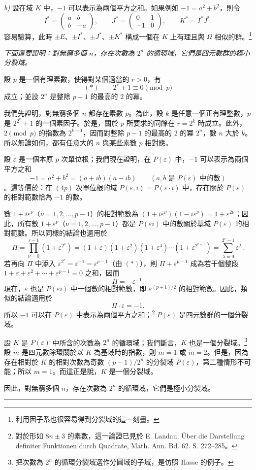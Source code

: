 \documentclass[11pt]{article}
\providecommand{\srcspaced}[1]{\emph{#1}}
\providecommand{\mat}[1]{\begin{pmatrix}#1\end{pmatrix}}
\begin{document}
\emph{b)} 設在域 $K$ 中，$-1$ 可以表示為兩個平方之和。如果例如 $-1=a^2+b^2$，則令
\[
        I^*=\mat{a&b\\ b&-a},\qquad
        J^*=\mat{0&1\\-1&0},\qquad
        K^*=I^*J^*.
\]
容易驗算，此時 $\pm E$、$\pm I^*$、$\pm J^*$、$\pm K^*$ 構成一個在 $K$ 上有理且與 $\Omega$ 相似的群。\footnote{利用因子系也很容易得到分裂域的這一刻畫。}

\srcspaced{下面還要證明：對無窮多個 $n$，存在次數為 $2^n$ 的循環域，它們是四元數群的極小分裂域。}

設 $p$ 是一個有理素數，使得對某個適當的 $r>0$，有
\[
        (*)\qquad 2^r+1\equiv0\pmod p
\]
成立；並設 $2^n$ 是整除 $p-1$ 的最高的 $2$ 的冪。

我們先證明，對無窮多個 $n$ 都存在素數 $p$。為此，設 $k$ 是任意一個正有理整數，$p$ 是 $2^{2^k}+1$ 的一個素因子。於是，關於 $p$ 所要求的同餘在 $r=2^k$ 時成立。此外，$2\pmod p$ 的指數為 $2^{k+1}$，因而對整除 $p-1$ 的最高的 $2$ 的冪 $2^n$，數 $n$ 大於 $k$。所以無論如何，都有任意大的 $n$ 與某些素數 $p$ 相對應。

設 $\varepsilon$ 是一個本原 $p$ 次單位根；我們現在證明，在 $P(\varepsilon)$ 中，$-1$ 可以表示為兩個平方之和
\[
        -1=a^2+b^2=(a+ib)(a-ib)\qquad (a,b\text{ 是 }P(\varepsilon)\text{ 中的數})
\]
。這等價於：在 $(4p)$ 次單位根的域 $P(\varepsilon,i)=P(\varepsilon\cdot i)$ 中，存在關於 $P(\varepsilon)$ 的相對範數恰為 $-1$ 的數。

數 $1+i\varepsilon^\nu$（$\nu=1,2,\ldots,p-1$）的相對範數為 $(1+i\varepsilon^\nu)(1-i\varepsilon^\nu)=1+\varepsilon^{2\nu}$；因此，所有數 $1+\varepsilon^\nu$（$\nu=1,2,\ldots,p-1$）都是 $P(\varepsilon i)$ 中的數關於基域 $P(\varepsilon)$ 的相對範數。所以同樣的結論也適用於
\[
\Pi=\prod_{\nu=0}^{r-1}(1+\varepsilon^{2^\nu})
=(1+\varepsilon)(1+\varepsilon^2)(1+\varepsilon^4)\cdots(1+\varepsilon^{2^{r-1}})
=\sum_{\lambda=0}^{2^r-1}\varepsilon^\lambda.
\]
若再向 $\Pi$ 中添入 $\varepsilon^{2^r}=\varepsilon^{-1}=\varepsilon^{p-1}$（由 $(*)$），則 $\Pi+\varepsilon^{p-1}$ 成為若干個整段 $1+\varepsilon+\varepsilon^2+\cdots+\varepsilon^{p-1}=0$ 之和，因而
\[
        \Pi=-\varepsilon^{-1}.
\]
現在，$\varepsilon$ 也是 $P(\varepsilon i)$ 中一個數的相對範數，即 $\varepsilon^{(p+1)/2}$ 的相對範數。因此，類似的結論適用於
\[
        \Pi\cdot\varepsilon=-1.
\]
所以 $-1$ 可以在 $P(\varepsilon)$ 中表示為兩個平方之和；\footnote{對於形如 $8n\pm3$ 的素數，這一論證已見於 E. Landau, Über die Darstellung definiter Funktionen durch Quadrate, Math. Ann. Bd. 62. S. 272--285。} $P(\varepsilon)$ 是四元數群的一個分裂域。

設 $K$ 是 $P(\varepsilon)$ 中所含的次數為 $2^n$ 的循環域；我們斷言，$K$ 也是一個分裂域。\footnote{把次數為 $2^n$ 的循環分裂域選作分圓域的子域，是仿照 Hasse 的例子。} 設 $m$ 是四元數除環關於以 $K$ 為基域時的指數，則 $m=1$ 或 $m=2$。但是，因為存在相對於 $K$ 的相對次數為奇數 $(p-1)/2^n$ 的分裂域 $P(\varepsilon)$，第二種情形不可能；所以 $m=1$。而這正是說，$K$ 是一個分裂域。

因此，對無窮多個 $n$，存在次數為 $2^n$ 的循環域，它們是極小分裂域。

\begin{center}
\rule{7em}{0.4pt}
\end{center}

\clearpage
\setcounter{footnote}{0}
\end{document}
